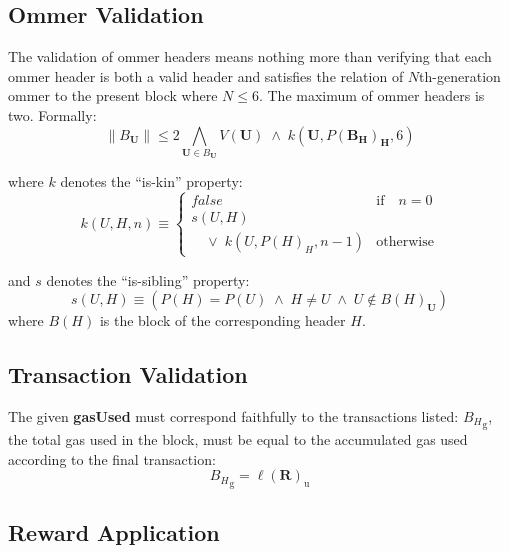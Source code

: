 \documentclass[9pt,oneside]{amsart}
\begin{document}
\begin{multicols}{2}
\subsection{Ommer Validation}

The validation of ommer headers means nothing more than verifying that each ommer header is both a valid header and satisfies the relation of $N$th-generation ommer to the present block where $N \leq 6$. The maximum of ommer headers is two. Formally:
\begin{equation}
\lVert B_{\mathbf{U}} \rVert \leqslant 2 \bigwedge_{\mathbf{U} \in B_{\mathbf{U}}} V({\mathbf{U}}) \; \wedge \; k({\mathbf{U}}, P(\mathbf{B}_{\mathbf{H}})_{\mathbf{H}}, 6)
\end{equation}

where $k$ denotes the ``is-kin'' property:
\begin{equation}
k(U, H, n) \equiv \begin{cases} false & \text{if} \quad n = 0 \\
s(U, H) &\\
\quad \vee \; k(U, P(H)_{H}, n - 1) & \text{otherwise}
\end{cases}
\end{equation}

and $s$ denotes the ``is-sibling'' property:
\begin{equation}
s(U, H) \equiv (P(H) = P(U)\; \wedge \; H \neq U \; \wedge \; U \notin B(H)_{\mathbf{U}})
\end{equation}
where $B(H)$ is the block of the corresponding header $H$.

\subsection{Transaction Validation}


The given \textbf{gasUsed} must correspond faithfully to the transactions listed: ${B_{H}}_{\mathrm{g}}$, the total gas used in the block, must be equal to the accumulated gas used according to the final transaction:
\begin{equation}
{B_{H}}_{\mathrm{g}} = \ell(\mathbf{R})_{\mathrm{u}}
\end{equation}

\subsection{Reward Application}


\end{multicols}
\end{document}
